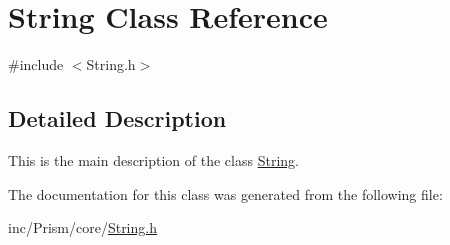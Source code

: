 \hypertarget{class_string}{}\section{String Class Reference}
\label{class_string}


{\ttfamily \#include $<$String.\+h$>$}



\subsection{Detailed Description}
This is the main description of the class \hyperlink{class_string}{String}. 

The documentation for this class was generated from the following file\+:\begin{DoxyCompactItemize}
\item 
inc/\+Prism/core/\hyperlink{_string_8h}{String.\+h}\end{DoxyCompactItemize}
